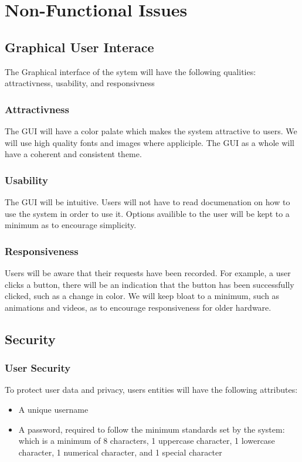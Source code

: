 \documentclass[letter, 12pt, titlepage]{article}
\begin{document}
		
	\section{Non-Functional Issues}

		\subsection{Graphical User Interace}
			The Graphical interface of the sytem will have the following qualities: attractivness, usability, and responsivness
			\subsubsection{Attractivness}
				The GUI will have a color palate which makes the system attractive to users. We will use high quality fonts and images where appliciple. The GUI as a whole will have a coherent and consistent theme. 
			\subsubsection{Usability}
				The GUI will be intuitive. Users will not have to read documenation on how to use the system in order to use it. Options availible to the user will be kept to a minimum as to encourage simplicity.
			\subsubsection{Responsiveness}
				Users will be aware that their requests have been recorded. For example, a user clicks a button, there will be an indication that the button has been successfully clicked, such as a change in color. We will keep bloat to a minimum, such as animations and videos, as to encourage responsiveness for older hardware.

		\subsection{Security}
			\subsubsection{User Security}
				To protect user data and privacy, users entities will have the following attributes:
				\begin{itemize}
						\item A unique username
						\item A password, required to follow the minimum standards set by the system: which is a minimum of 8 characters, 1 uppercase character, 1 lowercase character, 1 numerical character, and 1 special character
				\end{itemize}
\end{document}
